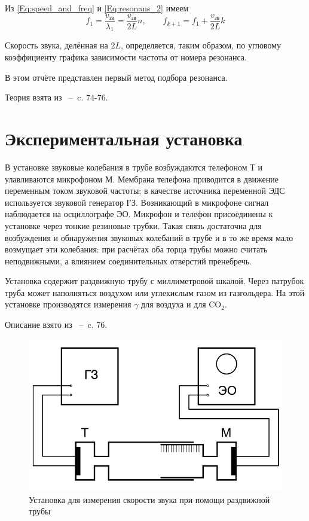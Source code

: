 \documentclass[a4paper,12pt]{article}
\begin{document}
Из \eqref{Eq:speed_and_freq} и \eqref{Eq:resonans_2} имеем
\begin{equation}
f_1=\frac{v_{\text{зв}}}{\lambda_1}=\frac{v_{\text{зв}}}{2L}n, \qquad f_{k+1}=f_1+\frac{v_{\text{зв}}}{2L}k
\label{Eq:res_2}
\end{equation}

Скорость звука, делённая на $2L$, определяется, таким образом, по угловому коэффициенту графика зависимости частоты от номера резонанса.

В этом отчёте представлен первый метод подбора резонанса.

Теория взята из \cite{Gladun:PrakTermodin}~--~c. 74-76.
\section{Экспериментальная установка}
В установке звуковые колебания в трубе возбуждаются телефоном Т и улавливаются микрофоном М. Мембрана телефона приводится в движение переменным током звуковой частоты; в качестве источника переменной ЭДС используется звуковой генератор ГЗ. Возникающий в микрофоне сигнал наблюдается на осциллографе ЭО. Микрофон и телефон присоединены к установке через тонкие резиновые трубки. Такая связь достаточна для возбуждения и обнаружения звуковых колебаний в трубе и в то же время мало возмущает эти колебания: при расчётах оба торца трубы можно считать неподвижными, а влиянием соединительных отверстий пренебречь. 

Установка содержит раздвижную трубу с миллиметровой шкалой. Через патрубок труба может наполняться воздухом или углекислым газом из газгольдера. На этой установке производятся измерения $\gamma$ для воздуха и для CO$_2$.

Описание взято из \cite{Gladun:PrakTermodin}~--~c. 76.
\begin{figure}[h!]
	\begin{center}
	\includegraphics[width=0.7\linewidth]{ust}
	\caption{Установка для измерения скорости звука при помощи раздвижной трубы}
	\label{Fig:ust}
\end{center}
\end{figure}
\end{document}

